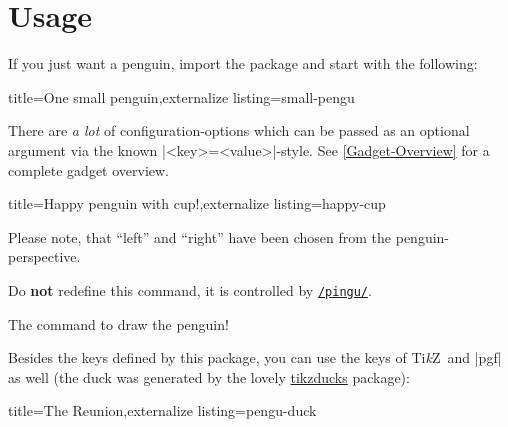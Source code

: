 \documentclass[parskip=half,english,numbers=noenddot,footnotes=nomultiple,oneside]{scrartcl}
\makeatletter
\let\say\enquote
\def\lpingu#1{\lstinline[style=lstpingu,language=pingulang]'#1'}
\let\@explainsuff\@empty
\let\@labelhack\@empty
\newcommand*\keyref[2][/pingu/]{\hyperref[pk:#1#2]{\lpingu{#1#2}}}
\newenvironment{commandexplain}[3][]{%
\begingroup
\def\@labelhack{/pingu/}%
\def\mand##1{\texttt{\{\textsf{\smaller##1}\}}}%
\def\@pingu@command@keypartner{#1}%
\newcommand\opt[2][]{\texttt{\textit{[\textsf{\smaller##2\ifx!##1!\else\textcolor{gray}{\smaller\sffamily=##1}\fi}]}}}%
\def\@explainsuff{#3}%
\keyexplain[]{\\#2}{}{}%
\ifx\@pingu@command@keypartner\@empty\else
{\@declaredcolor{gray}\footnotesize Do \textbf{not} redefine this command, it is controlled by \keyref{#1}.}\par\fi
}{\endkeyexplain\endgroup}
\def\TikZ{Ti\textit{k}Z}
\makeatother
\begin{document}
\section{Usage}\label{Usage}

If you just want a penguin, import the package and start with the following:
\begin{tcblisting}{title={One small penguin},externalize listing=small-pengu}
\begin{tikzpicture}
	\pingu
\end{tikzpicture}
\end{tcblisting}

There are \textit{a lot} of configuration-options which can be passed as an optional argument via the known |<key>=<value>|-style. See \autoref{Gadget-Overview} for a complete gadget overview.
\begin{tcblisting}{title={Happy penguin with cup!},externalize listing=happy-cup}
\end{tcblisting}
Please note, that \say{left} and \say{right} have been chosen from the penguin-perspective.

\begin{commandexplain}{pingu}{\opt{penguin keys}}
	The command to draw the penguin!
\end{commandexplain}

\clearpage Besides the keys defined by this package, you can use the keys of \TikZ\ and |pgf| as well (the duck was generated by the lovely \href{https://github.com/samcarter/tikzducks}{tikzducks} package):
\begin{tcblisting}{title={The Reunion},externalize listing=pengu-duck}
\begin{tikzpicture}
	\duck
	\pingu[xshift=2.7cm, yshift=14mm,
	       eyes wink]
\end{tikzpicture}
\end{tcblisting}
\end{document}
